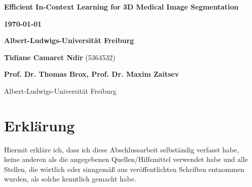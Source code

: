 \documentclass[hidelinks, a4paper, 12pt, ngerman, english]{article}  %
\begin{document}
\begingroup
\setlength{\parskip}{0pt}

\huge


\bigskip
\bigskip
\bigskip

\Large
\textbf{Efficient In-Context Learning for 3D Medical Image Segmentation}
\normalsize

\bigskip
\bigskip
\bigskip
\bigskip
\bigskip
\bigskip
\bigskip
\bigskip
\bigskip
\bigskip
\bigskip
\bigskip
\bigskip
\bigskip
\bigskip
\bigskip
\bigskip
\bigskip
\bigskip
\bigskip
\bigskip
\bigskip
\bigskip
\bigskip

\normalsize

\textbf{\today}

\textbf{Albert-Ludwigs-Universität Freiburg}

\textbf{Tidiane Camaret Ndir}
(5364532)

\textbf{Prof. Dr. Thomas Brox, Prof. Dr. Maxim Zaitsev}

\bigskip
\bigskip



Albert-Ludwigs-Universität Freiburg

\endgroup
\begingroup
\setlength{\parindent}{0pt}

\section*{Erklärung}

\bigskip
\bigskip
\bigskip

Hiermit erkläre ich, dass ich diese Abschlussarbeit selbständig verfasst habe, keine anderen
als die angegebenen Quellen/Hilfsmittel verwendet habe und alle Stellen, die wörtlich oder
sinngemäß aus veröffentlichten Schriften entnommen wurden, als solche kenntlich gemacht
habe.
\end{document}
